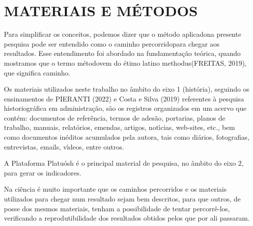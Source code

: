 \documentclass[
12pt,		%
openright,	%
twoside,  %
a4paper,			%
chapter=TITLE,		%
english,			%
french,				%
spanish,			%
brazil				%
]{USPSC-classe/USPSC}
\begin{document}
\chapter[MATERIAIS E M\'ETODOS]{MATERIAIS E M\'ETODOS}\label{MATERIAIS E M\'ETODOS}
Para simplificar os conceitos, podemos dizer que o \textquotedbl m\'etodo aplicado\textquotedbl  na presente pesquisa pode ser entendido como o \textquotedbl caminho percorrido\textquotedbl  para chegar aos resultados. Esse entendimento  foi abordado  na fundamenta\c{c}\~ao te\'orica, quando mostramos que o termo \textquotedbl m\'etodo\textquotedbl  vem do \'etimo latino \textquotedbl methodus\textquotedbl   (FREITAS, 2019), que significa \textquotedbl caminho\textquotedbl .

















Os materiais utilizados neste trabalho no \^ambito do eixo 1 (hist\'oria), seguindo os ensinamentos de  PIERANTI (2022) e  Costa e Silva (2019) referentes \`a pesquisa historiogr\'afica em administra\c{c}\~ao,  s\~ao os registros organizados em um acervo que cont\'em: documentos de refer\^encia, termos de ades\~ao, portarias, planos de trabalho, manuais, relat\'orios, emendas, artigos, not\'{\i}cias, web-sites, etc., bem como documentos in\'editos acumulados pela autora, tais como di\'arios, fotografias, entrevistas, emails, v\'{\i}deos, entre outros.

















A Plataforma Platu\'osh \'e o principal material de pesquisa, no \^ambito do eixo 2, para gerar os indicadores.

















Na ci\^encia \'e muito importante que os caminhos percorridos e os materiais utilizados para chegar num resultado sejam bem descritos, para que outros, de posse dos mesmos materiais, tenham a possibilidade de tentar percorr\^e-los, verificando a reprodutibilidade dos resultados obtidos pelos que por ali passaram.
\end{document}

